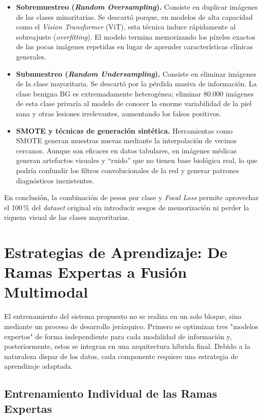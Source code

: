 \begin{itemize}
	\item \textbf{Sobremuestreo (\textit{Random Oversampling}).} Consiste en duplicar imágenes de las clases minoritarias. Se descartó porque, en modelos de alta capacidad como el \textit{Vision Transformer} (ViT), esta técnica induce rápidamente al sobreajuste (\textit{overfitting}). El modelo termina memorizando los píxeles exactos de las pocas imágenes repetidas en lugar de aprender características clínicas generales.
	
	\item \textbf{Submuestreo (\textit{Random Undersampling}).} Consiste en eliminar imágenes de la clase mayoritaria. Se descartó por la pérdida masiva de información. La clase benigna BG es extremadamente heterogénea; eliminar 80.000 imágenes de esta clase privaría al modelo de conocer la enorme variabilidad de la piel sana y otras lesiones irrelevantes, aumentando los falsos positivos.
	
	\item \textbf{SMOTE y técnicas de generación sintética.} Herramientas como SMOTE generan muestras nuevas mediante la interpolación de vecinos cercanos. Aunque son eficaces en datos tabulares, en imágenes médicas generan artefactos visuales y ``ruido'' que no tienen base biológica real, lo que podría confundir los filtros convolucionales de la red y generar patrones diagnósticos inexistentes.
\end{itemize}

En conclusión, la combinación de pesos por clase y \textit{Focal Loss} permite aprovechar el 100\,\% del \textit{dataset} original sin introducir sesgos de memorización ni perder la riqueza visual de las clases mayoritarias.

\section{Estrategias de Aprendizaje: De Ramas Expertas a Fusión Multimodal}

El entrenamiento del sistema propuesto no se realiza en un solo bloque, sino mediante un proceso de desarrollo jerárquico. Primero se optimizan tres "modelos expertos" de forma independiente para cada modalidad de información y, posteriormente, estos se integran en una arquitectura híbrida final. Debido a la naturaleza dispar de los datos, cada componente requiere una estrategia de aprendizaje adaptada.

\subsection{Entrenamiento Individual de las Ramas Expertas}

